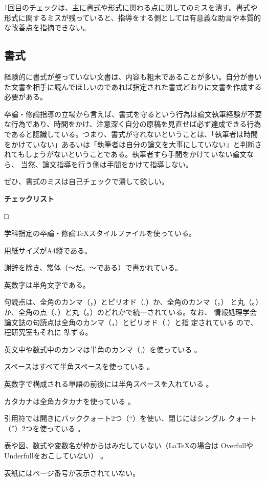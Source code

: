 \documentclass[11pt,a4j]{jsarticle}
\begin{document}
1回目のチェックは、主に書式や形式に関わる点に関してのミスを潰す。書式や
形式に関するミスが残っていると、指導をする側としては有意義な助言や本質的
な改善点を指摘できない。


\subsection{書式}

経験的に書式が整っていない文書は、内容も粗末であることが多い。自分が書い
た文書を相手に読んでほしいのであれば指定された書式どおりに文書を作成する
必要がある。

卒論・修論指導の立場から言えば、書式を守るという行為は論文執筆経験が不要
な行為であり、時間をかけ、注意深く自分の原稿を見直せば必ず達成できる行為
であると認識している。つまり、書式が守れないということは、「執筆者は時間
をかけていない」あるいは「執筆者は自分の論文を大事にしていない」と判断さ
れてもしょうがないということである。執筆者すら手間をかけていない論文なら、
当然、論文指導を行う側は手間をかけて指導しない。

ぜひ、書式のミスは自己チェックで潰して欲しい。

\begin{flushleft}
 {\bf チェックリスト}
\end{flushleft}
\begin{list}%
 {□} %
 {} %
 \item 学科指定の卒論・修論TeXスタイルファイルを使っている。
 \item 用紙サイズがA4縦である。
 \item 謝辞を除き、常体（〜だ。〜である）で書かれている。
 \item 英数字は半角文字である。
 \item 句読点は、全角のカンマ（，）とピリオド（.）か、全角のカンマ（，）
       と丸（。）か、全角の点（、）と丸（。）のどれかで統一されている。なお、
       情報処理学会論文誌の句読点は全角のカンマ（，）とピリオド（.）と指
       定されている \cite{IPSJ_HowToWrite_ver7.1} ので、程研究室もそれに
       準ずる。
 \item 英文中や数式中のカンマは半角のカンマ（,）を使っている
       \cite{IPSJ_HowToWrite_ver7.1}。
 \item スペースはすべて半角スペースを使っている
       \cite{IPSJ_HowToWrite_ver7.1}。
 \item 英数字で構成される単語の前後には半角スペースを入れている
       \cite{IPSJ_HowToWrite_ver7.1}。
 \item カタカナは全角カタカナを使っている \cite{IPSJ_HowToWrite_ver7.1}。
 \item 引用符では開きにバッククォート2つ（``）を使い、閉じにはシングル
       クォート（''）2つを使っている \cite{IPSJ_HowToWrite_ver7.1}。
 \item 表や図、数式や変数名が枠からはみだしていない（LaTeXの場合は
       OverfullやUnderfullをおこしていない）
       \cite{IPSJ_HowToWrite_ver7.1}。
 \item 表紙にはページ番号が表示されていない。
 \end{list}
\end{document}
